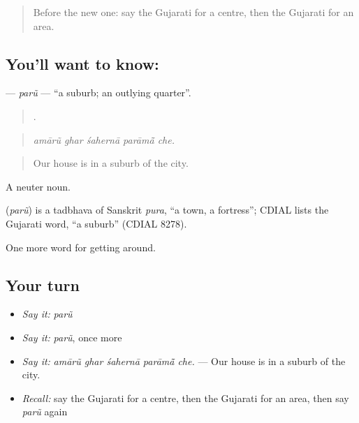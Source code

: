\label{lesson:GU-C416-paru}



\begin{quote}
Before the new one: say the Gujarati for a centre, then the Gujarati for an area.
\end{quote}

\subsection*{You'll want to know: }
\textbf{} — \emph{parũ} — \textquotedblleft{}a suburb; an outlying quarter\textquotedblright{}.

\begin{quote}
    .
\end{quote}

\begin{quote}
\emph{amārũ ghar śahernā parāmā̃ che.}
\end{quote}

\begin{quote}
Our house is in a suburb of the city.
\end{quote}

A neuter noun.

\begin{cousinweb}
\textbf{} (\emph{parũ}) is a tadbhava of Sanskrit \emph{pura}, \textquotedblleft{}a town, a fortress\textquotedblright{}; CDIAL lists the Gujarati word, \textquotedblleft{}a suburb\textquotedblright{} (CDIAL 8278).
\end{cousinweb}

\begin{grammarlens}[title={What you've built}]
One more word for getting around.
\end{grammarlens}

\subsection*{Your turn}
\begin{itemize}
\raggedright
  \item \emph{Say it:} \emph{parũ}
  \item \emph{Say it:} \emph{parũ}, once more
  \item \emph{Say it:} \emph{amārũ ghar śahernā parāmā̃ che.} — Our house is in a suburb of the city.
  \item \emph{Recall:} say the Gujarati for a centre, then the Gujarati for an area, then say \emph{parũ} again
\end{itemize}

